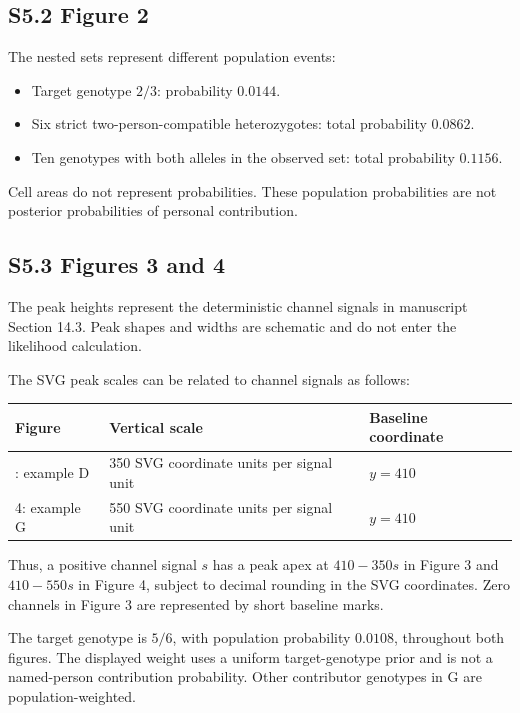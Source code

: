 \documentclass[
]{article}
\newcounter{none} %
\providecommand{\tightlist}{%
  \setlength{\itemsep}{0pt}\setlength{\parskip}{0pt}}
\begin{document}
\subsection{S5.2 Figure 2}\label{s5.2-figure-2}

The nested sets represent different population events:

\begin{itemize}
\tightlist
\item
  Target genotype \(2/3\): probability \(0.0144\).
\item
  Six strict two-person-compatible heterozygotes: total probability
  \(0.0862\).
\item
  Ten genotypes with both alleles in the observed set: total probability
  \(0.1156\).
\end{itemize}

Cell areas do not represent probabilities. These population
probabilities are not posterior probabilities of personal contribution.

\subsection{S5.3 Figures 3 and 4}\label{s5.3-figures-3-and-4}

The peak heights represent the deterministic channel signals in
manuscript Section 14.3. Peak shapes and widths are schematic and do not
enter the likelihood calculation.

The SVG peak scales can be related to channel signals as follows:

{\def\LTcaptype{none} %
\begin{longtable}[]{@{}lll@{}}
\toprule\noalign{}
Figure & Vertical scale & Baseline coordinate \\
\midrule\noalign{}
\endhead
\bottomrule\noalign{}
\endlastfoot
3: example D & 350 SVG coordinate units per signal unit & \(y=410\) \\
4: example G & 550 SVG coordinate units per signal unit & \(y=410\) \\
\end{longtable}
}

Thus, a positive channel signal \(s\) has a peak apex at \(410-350s\) in
Figure 3 and \(410-550s\) in Figure 4, subject to decimal rounding in
the SVG coordinates. Zero channels in Figure 3 are represented by short
baseline marks.

The target genotype is \(5/6\), with population probability \(0.0108\),
throughout both figures. The displayed weight uses a uniform
target-genotype prior and is not a named-person contribution
probability. Other contributor genotypes in G are population-weighted.
\end{document}
